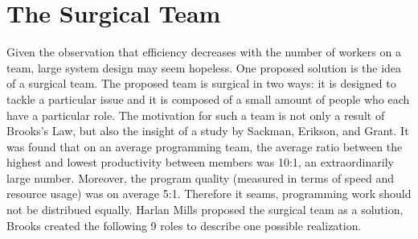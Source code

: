 \section{The Surgical Team}
Given the observation that efficiency decreases with the number of workers on a team, large system design may seem hopeless.  One proposed solution is the idea of a surgical team.  The proposed team is surgical in two ways: it is designed to tackle a particular issue and it is composed of a small amount of people who each have a particular role.  The motivation for such a team is not only a result of Brooks's Law, but also the insight of a study by Sackman, Erikson, and Grant.  It was found that on an average programming team, the average ratio between the highest and lowest productivity between members was 10:1, an extraordinarily large number.  Moreover, the program quality (measured in terms of speed and resource usage) was on average 5:1.  Therefore it seams, programming work should not be distribued equally.  Harlan Mills proposed the surgical team as a solution, Brooks created the following 9 roles to describe one possible realization.


